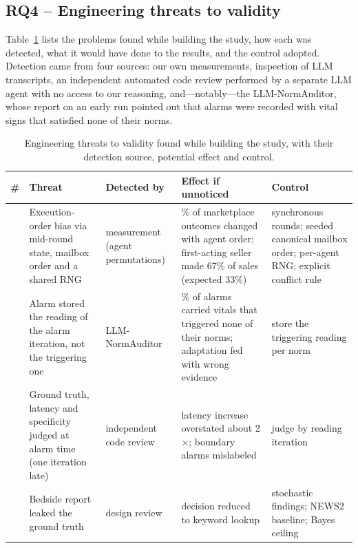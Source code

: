 \documentclass{ieeeaccess}
\begin{document}
\subsection{RQ4 – Engineering threats to validity}\label{sec:4.4}
Table~\ref{tab:8} lists the problems found while building the study, how each was detected, what it would have done to the results, and the control adopted. Detection came from four sources: our own measurements, inspection of LLM transcripts, an independent automated code review performed by a separate LLM agent with no access to our reasoning, and—notably—the LLM-NormAuditor, whose report on an early run pointed out that alarms were recorded with vital signs that satisfied none of their norms.

\begin{table}[!t]
\centering
\caption{Engineering threats to validity found while building the study, with their detection source, potential effect and control.}
\label{tab:8}
\footnotesize
\setlength{\tabcolsep}{0.06cm}
\renewcommand{\arraystretch}{1.15}
\begin{tabular}{@{}>{\raggedright\arraybackslash}p{}>{\raggedright\arraybackslash}p{}>{\raggedright\arraybackslash}p{}>{\raggedright\arraybackslash}p{}>{\raggedright\arraybackslash}p{}@{}}
\hline
\textbf{\#} & \textbf{Threat} & \textbf{Detected by} & \textbf{Effect if unnoticed} & \textbf{Control} \\ \hline
1 & Execution-order bias via mid-round state, mailbox order and a shared RNG & measurement (agent permutations) & 97\% of marketplace outcomes changed with agent order; first-acting seller made 67\% of sales (expected 33\%) & synchronous rounds; seeded canonical mailbox order; per-agent RNG; explicit conflict rule \\
2 & Alarm stored the reading of the alarm iteration, not the triggering one & LLM-NormAuditor & 62\% of alarms carried vitals that triggered none of their norms; adaptation fed with wrong evidence & store the triggering reading per norm \\
3 & Ground truth, latency and specificity judged at alarm time (one iteration late) & independent code review & latency increase overstated about 2$\times$; boundary alarms mislabeled & judge by reading iteration \\
4 & Bedside report leaked the ground truth & design review & decision reduced to keyword lookup & stochastic findings; NEWS2 baseline; Bayes ceiling \\

\end{tabular}
\end{table}
\end{document}
